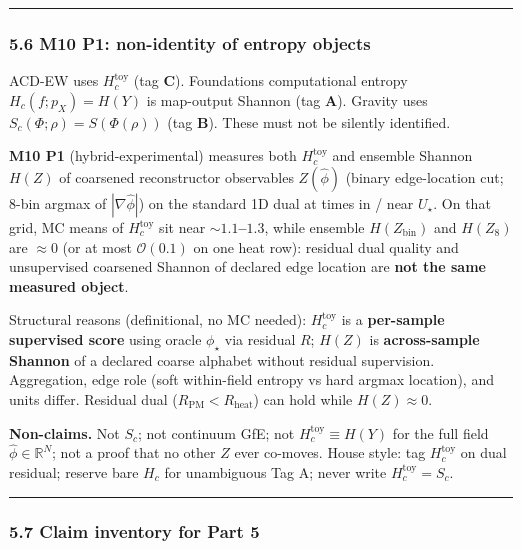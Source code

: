 \documentclass[
  11pt,
]{article}
\begin{document}
\begin{center}\rule{0.5\linewidth}{0.5pt}\end{center}

\subsubsection{5.6 M10 P1: non-identity of entropy objects}\label{m10-p1-non-identity-of-entropy-objects}

ACD-EW uses \(H_c^{\mathrm{toy}}\) (tag \textbf{C}). Foundations computational entropy \(H_c(f;p_X)=H(Y)\) is map-output Shannon (tag \textbf{A}). Gravity uses \(S_c(\Phi;\rho)=S(\Phi(\rho))\) (tag \textbf{B}). These must not be silently identified.

\textbf{M10 P1} (hybrid-experimental) measures both \(H_c^{\mathrm{toy}}\) and ensemble Shannon \(H(Z)\) of coarsened reconstructor observables \(Z(\hat\phi)\) (binary edge-location cut; 8-bin argmax of \(|\nabla\hat\phi|\)) on the standard 1D dual at times in / near \(U_\star\). On that grid, MC means of \(H_c^{\mathrm{toy}}\) sit near \textbf{\(\sim 1.1\)--\(1.3\)}, while ensemble \(H(Z_{\mathrm{bin}})\) and \(H(Z_8)\) are \textbf{\(\approx 0\)} (or at most \(\mathcal{O}(0.1)\) on one heat row): residual dual quality and unsupervised coarsened Shannon of declared edge location are \textbf{not the same measured object}.

Structural reasons (definitional, no MC needed): \(H_c^{\mathrm{toy}}\) is a \textbf{per-sample supervised score} using oracle \(\phi_\star\) via residual \(R\); \(H(Z)\) is \textbf{across-sample Shannon} of a declared coarse alphabet without residual supervision. Aggregation, edge role (soft within-field entropy vs hard argmax location), and units differ. Residual dual (\(R_{\mathrm{PM}}<R_{\mathrm{heat}}\)) can hold while \(H(Z)\approx 0\).

\textbf{Non-claims.} Not \(S_c\); not continuum GfE; not \(H_c^{\mathrm{toy}}\equiv H(Y)\) for the full field \(\hat\phi\in\mathbb{R}^N\); not a proof that no other \(Z\) ever co-moves. House style: tag \(H_c^{\mathrm{toy}}\) on dual residual; reserve bare \(H_c\) for unambiguous Tag A; never write \(H_c^{\mathrm{toy}}=S_c\).

\begin{center}\rule{0.5\linewidth}{0.5pt}\end{center}

\subsubsection{5.7 Claim inventory for Part 5}\label{claim-inventory-for-part-5}
\end{document}
